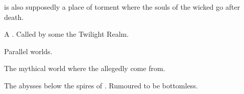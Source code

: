 \begin{gloss}
\Itzach{} is also supposedly a place of torment where the souls of the wicked go after death. 







\begin{comment}
\subsection{\Nyx}
\end{comment}
\gitem{\Nyx}
A . 
Called by some the Twilight Realm.








\begin{comment}
\subsection{Realms}
\end{comment}
Parallel worlds.







\begin{comment}
\subsection{Realm of Chaos}
\end{comment}
The mythical world where the  allegedly come from. 







\begin{comment}
\subsection{\Ullor}
\end{comment}
\gitem{\Ullor}
The abysses below the spires of \Nyx. 
Rumoured to be bottomless. 

\end{gloss}



















